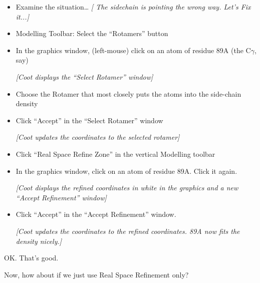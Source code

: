 \documentclass{article}
\begin{document}
\begin{itemize}
\item Examine the situation\ldots
  \emph{[ The sidechain is pointing the wrong way.  Let's Fix it...]}

\item Modelling Toolbar: Select the \textsf{``Rotamers''} button

\item In the graphics window, (left-mouse) click on an atom of residue
  89A (the C$\gamma$, say)

\textsl{ [\emph{Coot} displays the ``Select Rotamer'' window]}

\item Choose the Rotamer that most closely puts the atoms into the
  side-chain density %

\item Click \textsf{``Accept''} in the ``Select Rotamer'' window

\textsl{ [\emph{Coot} updates the coordinates to the selected rotamer]}

\item Click \textsf{``Real Space Refine Zone''} in the vertical Modelling toolbar

\item In the graphics window, click on an atom of residue 89A.  Click
  it again.

  \textsl{ [\emph{Coot} displays the refined coordinates in white in the
    graphics and a new ``Accept Refinement'' window]}

\item Click \textsf{``Accept''} in the ``Accept Refinement'' window.

  \textsl{ [\emph{Coot} updates the coordinates to the refined coordinates.
    89A now fits the density nicely.]}

\end{itemize}

OK. That's good.

Now, how about if we just use Real Space Refinement only?
\end{document}
